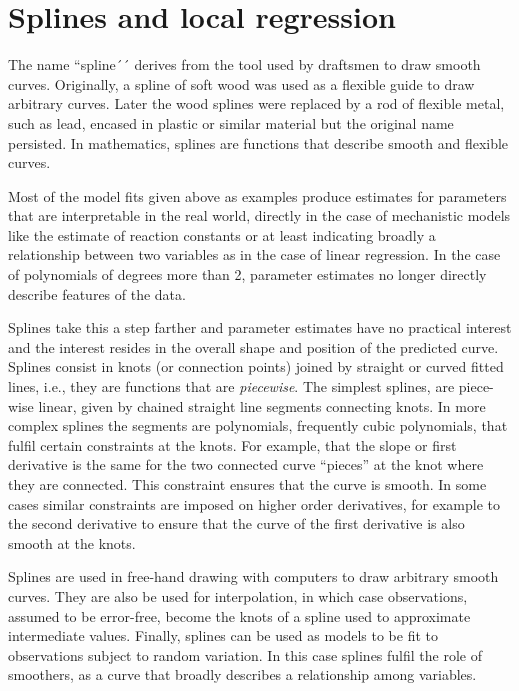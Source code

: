 \documentclass[krantz2]{krantz}\usepackage{knitr}
\begin{document}

\section{Splines and local regression}\label{sec:stat:splines}

The name ``spline´´ derives from the tool used by draftsmen to draw smooth curves. Originally, a spline of soft wood was used as a flexible guide to draw arbitrary curves. Later the wood splines were replaced by a rod of flexible metal, such as lead, encased in plastic or similar material but the original name persisted. In mathematics, splines are functions that describe smooth and flexible curves.

Most of the model fits given above as examples produce estimates for parameters that are interpretable in the real world, directly in the case of mechanistic models like the estimate of reaction constants or at least indicating broadly a relationship between two variables as in the case of linear regression. In the case of polynomials of degrees more than 2, parameter estimates no longer directly describe features of the data.

Splines take this a step farther and parameter estimates have no practical interest and the interest resides in the overall shape and position of the predicted curve. Splines consist in knots (or connection points) joined by straight or curved fitted lines, i.e., they are functions that are \emph{piecewise}. The simplest splines, are piece-wise linear, given by chained straight line segments connecting knots. In more complex splines the segments are polynomials, frequently cubic polynomials, that fulfil certain constraints at the knots. For example, that the slope or first derivative is the same for the two connected curve ``pieces'' at the knot where they are connected. This constraint ensures that the curve is smooth. In some cases similar constraints are imposed on higher order derivatives, for example to the second derivative to ensure that the curve of the first derivative is also smooth at the knots.

Splines are used in free-hand drawing with computers to draw arbitrary smooth curves. They are also be used for interpolation, in which case observations, assumed to be error-free, become the knots of a spline used to approximate intermediate values. Finally, splines can be used as models to be fit to observations subject to random variation. In this case splines fulfil the role of smoothers, as a curve that broadly describes a relationship among variables.
\end{document}
